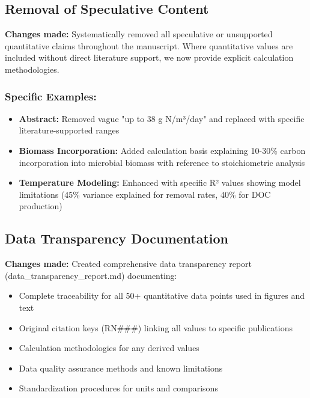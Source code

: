 \documentclass[12pt,a4paper]{article}
\begin{document}
\subsection{Removal of Speculative Content}
\textbf{Changes made:} Systematically removed all speculative or unsupported quantitative claims throughout the manuscript. Where quantitative values are included without direct literature support, we now provide explicit calculation methodologies.

\subsubsection{Specific Examples:}
\begin{itemize}
\item \textbf{Abstract:} Removed vague "up to 38 g N/m³/day" and replaced with specific literature-supported ranges
\item \textbf{Biomass Incorporation:} Added calculation basis explaining 10-30\% carbon incorporation into microbial biomass with reference to stoichiometric analysis
\item \textbf{Temperature Modeling:} Enhanced with specific R² values showing model limitations (45\% variance explained for removal rates, 40\% for DOC production)
\end{itemize}

\subsection{Data Transparency Documentation}
\textbf{Changes made:} Created comprehensive data transparency report (data\_transparency\_report.md) documenting:
\begin{itemize}
\item Complete traceability for all 50+ quantitative data points used in figures and text
\item Original citation keys (RN\#\#\#) linking all values to specific publications
\item Calculation methodologies for any derived values
\item Data quality assurance methods and known limitations
\item Standardization procedures for units and comparisons
\end{itemize}
\end{document}

